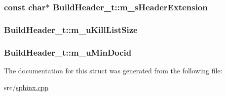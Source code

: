 \hypertarget{structBuildHeader__t_a80651479560648edccc7ac74f48ae3de}{
\subsubsection[{m\-\_\-s\-Header\-Extension}]{\setlength{\rightskip}{0pt plus 5cm}const char$\ast$ Build\-Header\-\_\-t\-::m\-\_\-s\-Header\-Extension}}\label{structBuildHeader__t_a80651479560648edccc7ac74f48ae3de}
\hypertarget{structBuildHeader__t_a537c06b57103c7d52f2c0f5096b6170b}{
\subsubsection[{m\-\_\-u\-Kill\-List\-Size}]{ Build\-Header\-\_\-t\-::m\-\_\-u\-Kill\-List\-Size}}\label{structBuildHeader__t_a537c06b57103c7d52f2c0f5096b6170b}
\hypertarget{structBuildHeader__t_a79ae5094fceb731033d83c6a8613715b}{
\subsubsection[{m\-\_\-u\-Min\-Docid}]{ Build\-Header\-\_\-t\-::m\-\_\-u\-Min\-Docid}}\label{structBuildHeader__t_a79ae5094fceb731033d83c6a8613715b}


The documentation for this struct was generated from the following file\-:\begin{DoxyCompactItemize}
\item 
src/\hyperlink{sphinx_8cpp}{sphinx.\-cpp}\end{DoxyCompactItemize}
